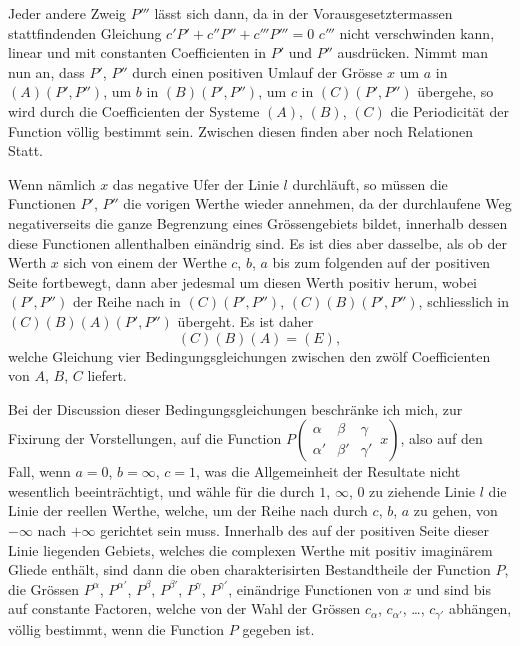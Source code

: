 \documentclass[12pt,a4paper]{article}
\begin{document}
Jeder andere Zweig $P'''$ lässt sich dann, da in der Vorausgesetztermassen stattfindenden Gleichung $c'P' + c''P'' + c'''P''' = 0$ $c'''$ nicht verschwinden kann, linear und mit constanten Coefficienten in $P'$ und $P''$ ausdrücken. Nimmt man nun an, dass $P'$, $P''$ durch einen positiven Umlauf der Grösse $x$ um $a$ in $(A)(P', P'')$, um $b$ in $(B)(P', P'')$, um $c$ in $(C)(P', P'')$ übergehe, so wird durch die Coefficienten der Systeme $(A)$, $(B)$, $(C)$ die Periodicität der Function völlig bestimmt sein. Zwischen diesen finden aber noch Relationen Statt.

Wenn nämlich $x$ das negative Ufer der Linie $l$ durchläuft, so müssen die Functionen $P'$, $P''$ die vorigen Werthe wieder annehmen, da der durchlaufene Weg negativerseits die ganze Begrenzung eines Grössengebiets bildet, innerhalb dessen diese Functionen allenthalben einändrig sind. Es ist dies aber dasselbe, als ob der Werth $x$ sich von einem der Werthe $c$, $b$, $a$ bis zum folgenden auf der positiven Seite fortbewegt, dann aber jedesmal um diesen Werth positiv herum, wobei $(P', P'')$ der Reihe nach in $(C)(P', P'')$, $(C)(B)(P', P'')$, schliesslich in $(C)(B)(A)(P', P'')$ übergeht. Es ist daher
\begin{equation}
(C)(B)(A) = (E), \tag{1}
\end{equation}
welche Gleichung vier Bedingungsgleichungen zwischen den zwölf Coefficienten von $A$, $B$, $C$ liefert.

Bei der Discussion dieser Bedingungsgleichungen beschränke ich mich, zur Fixirung der Vorstellungen, auf die Function $P\left(\begin{array}{ccc|} \alpha & \beta & \gamma \\ \alpha' & \beta' & \gamma' \end{array}\, x\right)$, also auf den Fall, wenn $a = 0$, $b = \infty$, $c = 1$, was die Allgemeinheit der Resultate nicht wesentlich beeinträchtigt, und wähle für die durch $1$, $\infty$, $0$ zu ziehende Linie $l$ die Linie der reellen Werthe, welche, um der Reihe nach durch $c$, $b$, $a$ zu gehen, von $-\infty$ nach $+\infty$ gerichtet sein muss. Innerhalb des auf der positiven Seite dieser Linie liegenden Gebiets, welches die complexen Werthe mit positiv imaginärem Gliede enthält, sind dann die oben charakterisirten Bestandtheile der Function $P$, die Grössen $P^{\alpha}$, $P^{\alpha'}$, $P^{\beta}$, $P^{\beta'}$, $P^{\gamma}$, $P^{\gamma'}$, einändrige Functionen von $x$ und sind bis auf constante Factoren, welche von der Wahl der Grössen $c_{\alpha}$, $c_{\alpha'}$, \dots, $c_{\gamma'}$ abhängen, völlig bestimmt, wenn die Function $P$ gegeben ist.
\end{document}
